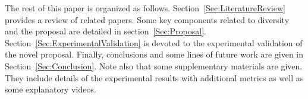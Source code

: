 The rest of this paper is organized as follows. 
%
Section~\ref{Sec:LiteratureReview} provides a review of related papers.
%
Some key components related to diversity and the \VSDMOEA{} proposal are detailed in section~\ref{Sec:Proposal}.
%
Section~\ref{Sec:ExperimentalValidation} is devoted to the experimental validation of the novel proposal.
%
Finally, conclusions and some lines of future work are given in Section~\ref{Sec:Conclusion}.
%
Note also that some supplementary materials are given.
%
They include details of the experimental results with additional metrics as well as some
explanatory videos.
